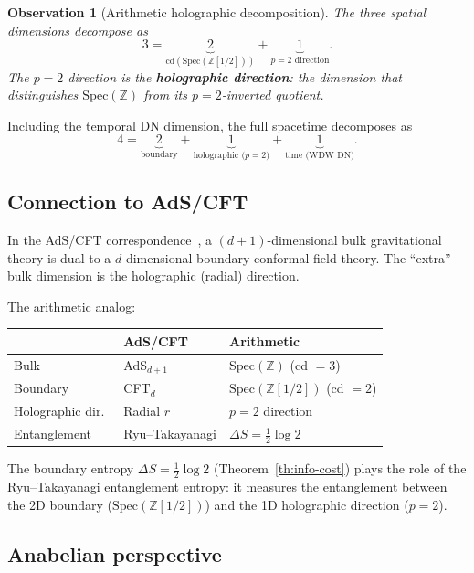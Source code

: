 \documentclass[11pt,a4paper]{article}
\newtheorem{observation}{Observation}
\begin{document}
\begin{observation}[Arithmetic holographic decomposition]
The three spatial dimensions decompose as
\begin{equation}
3 = \underbrace{2}_{\mathrm{cd}(\mathrm{Spec}(\mathbb{Z}[1/2]))} +
\underbrace{1}_{p = 2 \text{ direction}}.
\end{equation}
The $p = 2$ direction is the \textbf{holographic direction}: the
dimension that distinguishes $\mathrm{Spec}(\mathbb{Z})$ from its
$p = 2$-inverted quotient.
\end{observation}

Including the temporal DN dimension, the full spacetime
decomposes as
\begin{equation}
4 = \underbrace{2}_{\text{boundary}} +
\underbrace{1}_{\text{holographic ($p{=}2$)}} +
\underbrace{1}_{\text{time (WDW DN)}}.
\end{equation}

\subsection{Connection to AdS/CFT}

In the AdS/CFT correspondence~\cite{Maldacena1999}, a
$(d+1)$-dimensional bulk gravitational theory is dual to a
$d$-dimensional boundary conformal field theory. The ``extra''
bulk dimension is the holographic (radial) direction.

The arithmetic analog:
\begin{center}
\begin{tabular}{lll}
\toprule
& AdS/CFT & Arithmetic \\
\midrule
Bulk & AdS$_{d+1}$ & $\mathrm{Spec}(\mathbb{Z})$ (cd $= 3$) \\
Boundary & CFT$_d$ & $\mathrm{Spec}(\mathbb{Z}[1/2])$ (cd $= 2$) \\
Holographic dir.\ & Radial $r$ & $p = 2$ direction \\
Entanglement & Ryu--Takayanagi & $\Delta S = \frac{1}{2}\log 2$ \\
\bottomrule
\end{tabular}
\end{center}

The boundary entropy $\Delta S = \frac{1}{2}\log 2$
(Theorem~\ref{th:info-cost}) plays the role of the
Ryu--Takayanagi entanglement entropy: it measures the
entanglement between the 2D boundary
($\mathrm{Spec}(\mathbb{Z}[1/2])$) and the 1D holographic
direction ($p = 2$).

\subsection{Anabelian perspective}
\end{document}
